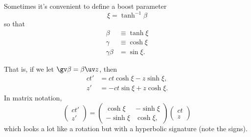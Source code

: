 Sometimes it's convenient to define a boost parameter
\begin{equation}
    \xi = \tanh^{-1}\beta
\end{equation}
so that
\begin{align*}
    \beta &\equiv \tanh \xi\\
    \gamma &\equiv \cosh \xi\\
    \gamma \beta &= \sin \xi.
\end{align*}

That is, if we let $\gv \beta = \beta \uv z$, then
\begin{align}
    ct' &= ct \cosh \xi - z \sinh \xi,\\
    z' &= -ct \sin \xi + z\cosh \xi.
\end{align}
In matrix notation,
\begin{equation}
    \begin{pmatrix}
        ct' \\ z'
    \end{pmatrix}
    =
    \begin{pmatrix}
        \cosh \xi & -\sinh \xi\\
        -\sinh \xi & \cosh \xi,
    \end{pmatrix}
    \begin{pmatrix}
        ct \\ z
    \end{pmatrix}
\end{equation}
which looks a lot like a rotation but with a hyperbolic signature (note the signs).
